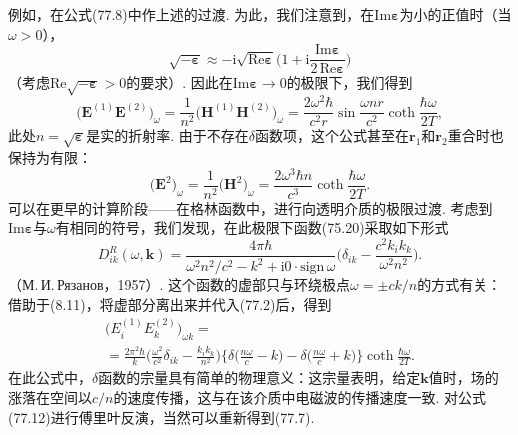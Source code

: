 例如，在公式(77.8)中作上述的过渡. 为此，我们注意到，在$\mathrm{Im}\bm{\varepsilon}$为小的正值时（当$\omega>0$），
\begin{equation*}
\sqrt{-\bm{\varepsilon}}\approx-\mathrm{i}\sqrt{\mathrm{Re}\bm{\varepsilon}}\biggl(1+\mathrm{i}\frac{\mathrm{Im}\bm{\varepsilon}}{2\,\mathrm{Re}\bm{\varepsilon}}\biggr)
\end{equation*}
（考虑$\mathrm{Re}\sqrt{-\bm{\varepsilon}}>0$的要求）. 因此在$\mathrm{Im}\bm{\varepsilon}\to0$的极限下，我们得到
\begin{equation}
\bigl(\bm{E}^{(1)}\bm{E}^{(2)}\bigr)_{\omega}=\frac{1}{n^{2}}\bigl(\bm{H}^{(1)}\bm{H}^{(2)}\bigr)_{\omega}
=\frac{2\omega^{2}\hbar}{c^{2}r}\sin\frac{\omega nr}{c^{2}}\coth\frac{\hbar\omega}{2T},
\end{equation}
此处$n=\sqrt{\bm{\varepsilon}}$是实的折射率. 由于不存在$\delta$函数项，这个公式甚至在$\bm{r}_{1}$和$\bm{r}_{2}$重合时也保持为有限：
\begin{equation}
\bigl(\bm{E}^{2}\bigr)_{\omega}=\frac{1}{n^{2}}\bigl(\bm{H}^{2}\bigr)_{\omega}=\frac{2\omega^{3}\hbar n}{c^{3}}\coth\frac{\hbar\omega}{2T}.
\end{equation}
可以在更早的计算阶段——在格林函数中，进行向透明介质的极限过渡. 考虑到$\mathrm{Im}\bm{\varepsilon}$与$\omega$有相同的符号，我们发现，在此极限下函数(75.20)采取如下形式
\begin{equation}
D_{ik}^{R}(\omega,\bm{k})=\frac{4\pi\hbar}{\omega^{2}n^{2}/c^{2}-k^{2}+\mathrm{i}0\cdot\mathrm{sign}\,\omega}
\biggl(\delta_{ik}-\frac{c^{2}k_{i}k_{k}}{\omega^{2}n^{2}}\biggr).
\end{equation}
（М.\,И.\,Рязанов，1957）. 这个函数的虚部只与环绕极点$\omega=\pm ck/n$的方式有关：借助于(8.11)，将虚部分离出来并代入(77.2)后，得到
\begin{equation}
\begin{aligned}
\bigl(E_{i}^{(1)}E_{k}^{(2)}\bigr)_{\omega k}={}\\
{}=\frac{2\pi^{2}\hbar}{k}\biggl(\frac{\omega^{2}}{c^{2}}\delta_{ik}-\frac{k_{i}k_{k}}{n^{2}}\biggr)
\biggl\{\delta\biggl(\frac{n\omega}{c}-k\biggr)-\delta\biggl(\frac{n\omega}{c}+k\biggr)\biggr\}\coth\frac{\hbar\omega}{2T}.
\end{aligned}
\end{equation}
在此公式中，$\delta$函数的宗量具有简单的物理意义：这宗量表明，给定$\bm{k}$值时，场的涨落在空间以$c/n$的速度传播，这与在该介质中电磁波的传播速度一致. 对公式(77.12)进行傅里叶反演，当然可以重新得到(77.7).

